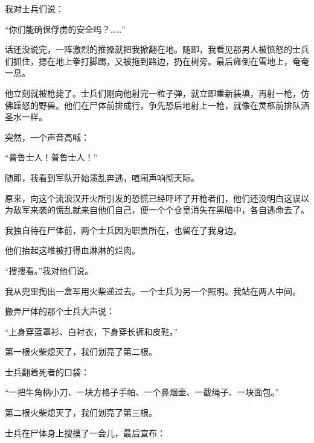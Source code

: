 \documentclass{article}
\begin{document}
我对士兵们说：



“你们能确保俘虏的安全吗？……”



话还没说完，一阵激烈的推搡就把我掀翻在地。随即，我看见那男人被愤怒的士兵们抓住，摁在地上拳打脚踢，又被拖到路边，扔在树旁。最后瘫倒在雪地上，奄奄一息。



他立刻就被枪毙了。士兵们刚向他射完一粒子弹，就立即重新装填，再射一枪，仿佛躁怒的野兽。他们在尸体前排成行，争先恐后地射上一枪，就像在灵柩前排队洒圣水一样。



突然，一个声音高喊：



“普鲁士人！普鲁士人！”



随即，我看到军队开始溃乱奔逃，喧闹声响彻天际。



原来，向这个流浪汉开火所引发的恐慌已经吓坏了开枪者们，他们还没明白这误以为敌军来袭的慌乱就来自他们自己，便一个个仓皇消失在黑暗中，各自逃命去了。



我独自待在尸体前，两个士兵因为职责所在，也留在了我身边。



他们抬起这堆被打得血淋淋的烂肉。



“搜搜看。”我对他们说。



我从兜里掏出一盒军用火柴递过去。一个士兵为另一个照明。我站在两人中间。



搬弄尸体的那个士兵大声说：



“上身穿蓝罩衫、白衬衣，下身穿长裤和皮鞋。”



第一根火柴熄灭了，我们划亮了第二根。



士兵翻着死者的口袋：



“一把牛角柄小刀、一块方格子手帕、一个鼻烟壶、一截绳子、一块面包。”



第二根火柴熄灭了，我们划亮了第三根。



士兵在尸体身上搜摸了一会儿，最后宣布：
\end{document}
